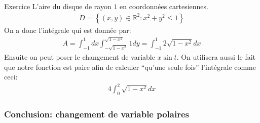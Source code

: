 \begin{parag}{Exercice}
    L'aire du disque de rayon $1$ en coordonnées cartesiennes.
    \begin{align*} D =  \left\{\left(x, y\right) \in \mathbb{R}^{2}: x^2 + y^2 \leq 1\right\} \end{align*}
    On a donc l'intégrale qui est donnée par:
    \begin{align*} 
        A =  \int_{-1}^1 dx \int_{-\sqrt{1 - x^2}}^{\sqrt{1 - x^2}}1 dy =  \int_{-1}^1 2 \sqrt{1 - x^2}dx
    \end{align*}
    Ensuite on peut poser le changement de variable $x \sin t$. On utilisera aussi le fait que notre fonction est paire afin de calculer ``qu'une seule fois'' l'intégrale comme ceci:
    \begin{align*} 4 \int_0^2 \sqrt{1-x^2}dx \end{align*}
\end{parag}

\subsubsection{Conclusion: changement de variable polaires}


